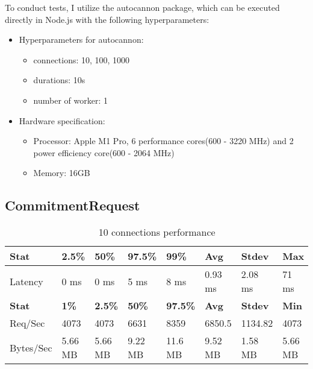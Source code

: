 \documentclass[../Main.tex]{subfiles}
\begin{document}
To conduct tests, I utilize the autocannon\cite{autocannon} package, which can be executed directly in Node.js with the following hyperparameters:
\begin{itemize}
  \item Hyperparameters for autocannon:
    \begin{itemize}
      \item connections: 10, 100, 1000
      \item durations: 10s
      \item number of worker: 1
    \end{itemize}
  \item Hardware specification:
    \begin{itemize}
      \item Processor: Apple M1 Pro, 6 performance cores(600 - 3220 MHz) and 2 power efficiency core(600 - 2064 MHz)
      \item Memory: 16GB
    \end{itemize}
\end{itemize}

\subsection{CommitmentRequest}
\begin{table}[H]
\centering
\begin{tabular}{|l|l|l|l|l|l|l|l|}
\hline
\rowcolor[HTML]{f56b00}
\textbf{Stat} & \textbf{2.5\%} & \textbf{50\%} & \textbf{97.5\%} & \textbf{99\%} & \textbf{Avg} & \textbf{Stdev} & \textbf{Max} \\
\hline
Latency   & 0 ms  & 0 ms & 5 ms   & 8 ms & 0.93 ms & 2.08 ms & 71 ms \\
\hline
\rowcolor[HTML]{f56b00}
\textbf{Stat} & \textbf{1\%} & \textbf{2.5\%} & \textbf{50\%} & \textbf{97.5\%} & \textbf{Avg} & \textbf{Stdev} & \textbf{Min} \\
Req/Sec   & 4073  & 4073  & 6631   & 8359   & 6850.5  & 1134.82 & 4073  \\
\hline
Bytes/Sec & 5.66 MB & 5.66 MB & 9.22 MB & 11.6 MB & 9.52 MB & 1.58 MB & 5.66 MB \\
\hline
\end{tabular}
 \caption{10 connections performance}
 \label{10-connections-performance}
\end{table}
\end{document}
